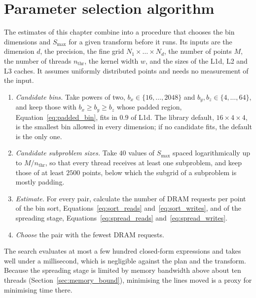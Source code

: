 \section{Parameter selection algorithm}
\label{sec:selection_algorithm}
The estimates of this chapter combine into a procedure that chooses the bin dimensions and $S_{\max}$ for a given transform before it runs. Its inputs are the dimension $d$, the precision, the fine grid $N_1 \times \dots \times N_d$, the number of points $M$, the number of threads $n_{\mathrm{thr}}$, the kernel width $w$, and the sizes of the L1d, L2 and L3 caches. It assumes uniformly distributed points and needs no measurement of the input.
\begin{enumerate}
    \item \emph{Candidate bins.} Take powers of two, $b_x \in \{16, \dots, 2048\}$ and $b_y, b_z \in \{4, \dots, 64\}$, and keep those with $b_x \ge b_y \ge b_z$ whose padded region, Equation~\eqref{eq:padded_bin}, fits in $0.9$ of L1d. The library default, $16 \times 4 \times 4$, is the smallest bin allowed in every dimension; if no candidate fits, the default is the only one.
    \item \emph{Candidate subproblem sizes.} Take $40$ values of $S_{\max}$ spaced logarithmically up to $M / n_{\mathrm{thr}}$, so that every thread receives at least one subproblem, and keep those of at least $2500$ points, below which the subgrid of a subproblem is mostly padding.
    \item \emph{Estimate.} For every pair, calculate the number of DRAM requests per point of the bin sort, Equations~\eqref{eq:sort_reads} and~\eqref{eq:sort_writes}, and of the spreading stage, Equations~\eqref{eq:spread_reads} and~\eqref{eq:spread_writes}. 
    \item \emph{Choose} the pair with the fewest DRAM requests.
\end{enumerate}
The search evaluates at most a few hundred closed-form expressions and takes well under a millisecond, which is negligible against the plan and the transform. Because the spreading stage is limited by memory bandwidth above about ten threads (Section~\ref{sec:memory_bound}), minimising the lines moved is a proxy for minimising time there.
